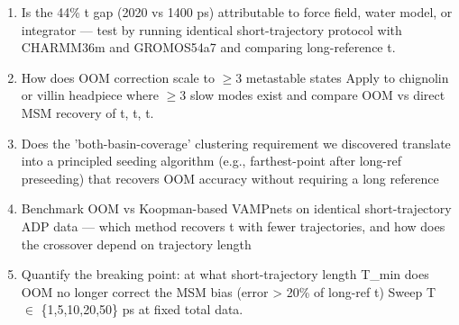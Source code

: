 \begin{enumerate}[leftmargin=1.6em,itemsep=0.2em,topsep=0.2em,label=Q\arabic*.]
\item Is the 44\% t gap (2020 vs 1400 ps) attributable to force field, water model, or integrator --- test by running identical short-trajectory protocol with CHARMM36m and GROMOS54a7 and comparing long-reference t.
\item How does OOM correction scale to $\geq$3 metastable states Apply to chignolin or villin headpiece where $\geq$3 slow modes exist and compare OOM vs direct MSM recovery of t, t, t.
\item Does the 'both-basin-coverage' clustering requirement we discovered translate into a principled seeding algorithm (e.g., farthest-point after long-ref preseeding) that recovers OOM accuracy without requiring a long reference
\item Benchmark OOM vs Koopman-based VAMPnets on identical short-trajectory ADP data --- which method recovers t with fewer trajectories, and how does the crossover depend on trajectory length
\item Quantify the breaking point: at what short-trajectory length T\_min does OOM no longer correct the MSM bias (error \textgreater{} 20\% of long-ref t) Sweep T $\in$ \{1,5,10,20,50\} ps at fixed total data.
\end{enumerate}

